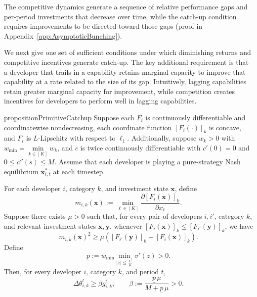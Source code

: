 The competitive dynamics generate a sequence of relative performance gaps and per-period investments that decrease over time, while the catch-up condition requires improvements to be directed toward those gaps (proof in Appendix~\ref{app:AsymptoticBunching}).

We next give one set of sufficient conditions under which diminishing returns and competitive incentives generate catch-up. 
The key additional requirement is that a developer that trails in a capability retains marginal capacity to improve that capability at a rate related to the size of its gap.
Intuitively, lagging capabilities retain greater marginal capacity for improvement, while competition creates incentives for developers to perform well in lagging capabilities.

\begin{restatable}{proposition}{PrimitiveCatchup}
\label{prop:PrimitiveCatchup}
Suppose each $F_i$ is continuously differentiable and coordinatewise
nondecreasing, each coordinate function $[F_i(\cdot)]_k$ is concave, and
$F_i$ is $L$-Lipschitz with respect to $\ell_1$.
Additionally, suppose $w_k>0$ with $w_{\mathrm{min}} = \min\limits_{k \in [K]} w_k$, and $c$ is twice continuously differentiable with $c'(0)=0$ and $0\le c''(s)\le M$. 
Assume that each developer is playing a pure-strategy Nash equilibrium $\mathbf{x}^*_{i,t}$ at each timestep.  

For each developer $i$, category $k$, and investment state $\mathbf x$, define
\[
    m_{i,k}(\mathbf x)
    :=
    \min_{\ell\in[K]}
    \frac{\partial [F_i(\mathbf x)]_k}{\partial x_\ell}.
\]
Suppose there exists $\mu>0$ such that, for every pair of developers
$i,i'$, category $k$, and relevant investment states $\mathbf x,\mathbf y$,
whenever $[F_i(\mathbf x)]_k \le [F_{i'}(\mathbf y)]_k$, we have
\[ 
    m_{i,k}(\mathbf x)^2
    \ge
    \mu\left(
        [F_{i'}(\mathbf y)]_k-[F_i(\mathbf x)]_k
    \right).
\] 
Define
\[
    \underline p
    :=
    w_{\mathrm{min}}
    \min_{|z|\le \frac{L^2}{\mu}}\sigma'(z)>0.
\]
Then, for every developer $i$, category $k$, and period $t$,
\[
    \Delta\theta_{i,k}^t
    \ge
    \beta g_{i,k}^t,
    \qquad
    \beta
    :=
    \frac{\underline p\,\mu}
         {M+\underline p\,\mu}
    >0.
\] 
\end{restatable}

